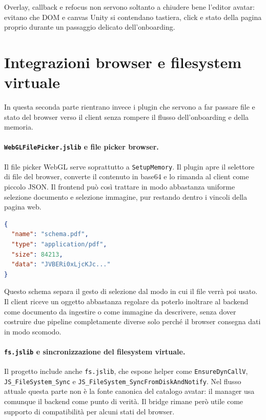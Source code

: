 Overlay, callback e refocus non servono soltanto a chiudere bene l'editor avatar: evitano che DOM e canvas Unity si contendano tastiera, click e stato della pagina proprio durante un passaggio delicato dell'onboarding.

\section{Integrazioni browser e filesystem virtuale}
In questa seconda parte rientrano invece i plugin che servono a far passare file e stato del browser verso il client senza rompere il flusso dell'onboarding e della memoria.

\paragraph{\normalfont\texttt{WebGLFilePicker.jslib} e file picker browser.}
Il file picker WebGL serve soprattutto a \texttt{SetupMemory}. Il plugin apre il selettore di file del browser, converte il contenuto in base64 e lo rimanda al client come piccolo JSON. Il frontend può così trattare in modo abbastanza uniforme selezione documento e selezione immagine, pur restando dentro i vincoli della pagina web.

\begin{lstlisting}[language=json,caption={Payload tipico del file picker WebGL verso Unity.}]
{
  "name": "schema.pdf",
  "type": "application/pdf",
  "size": 84213,
  "data": "JVBERi0xLjcKJc..."
}
\end{lstlisting}

Questo schema separa il gesto di selezione dal modo in cui il file verrà poi usato. Il client riceve un oggetto abbastanza regolare da poterlo inoltrare al backend come documento da ingestire o come immagine da descrivere, senza dover costruire due pipeline completamente diverse solo perché il browser consegna dati in modo scomodo.

\paragraph{\normalfont\texttt{fs.jslib} e sincronizzazione del filesystem virtuale.}
Il progetto include anche \texttt{fs.jslib}, che espone helper come \texttt{EnsureDynCallV}, \texttt{JS\_FileSystem\_Sync} e \texttt{JS\_FileSystem\_SyncFromDiskAndNotify}. Nel flusso attuale questa parte non è la fonte canonica del catalogo avatar: il manager usa comunque il backend come punto di verità. Il bridge rimane però utile come supporto di compatibilità per alcuni stati del browser.


